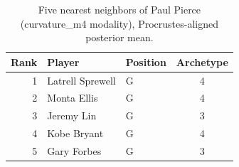 \begin{table}[htbp]
  \centering\small
  \begin{tabular}{rllc}
    \toprule
    Rank & Player & Position & Archetype \\
    \midrule
    1 & Latrell Sprewell & G & 4 \\
    2 & Monta Ellis & G & 4 \\
    3 & Jeremy Lin & G & 3 \\
    4 & Kobe Bryant & G & 4 \\
    5 & Gary Forbes & G & 3 \\
    \bottomrule
  \end{tabular}
  \caption{Five nearest neighbors of Paul Pierce (curvature_m4 modality), Procrustes-aligned posterior mean.}
  \label{tab:Paul_Pierce_neighbors_curvature_m4}
\end{table}

